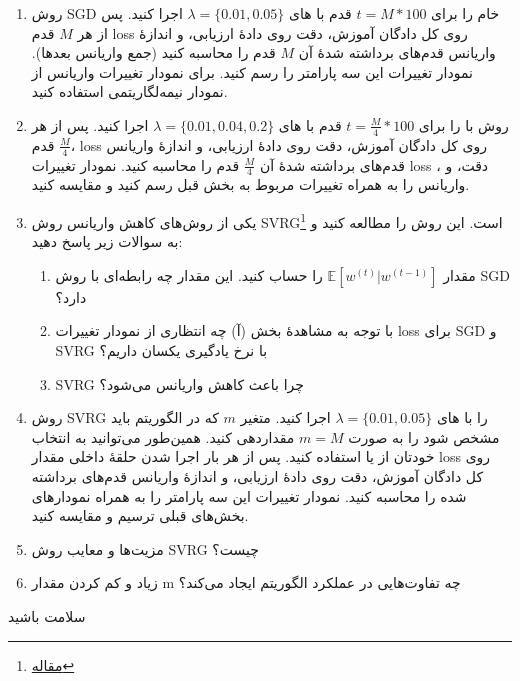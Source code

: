 \documentclass[11pt,a4paper]{article}
\begin{document}
\begin{enumerate}
\item
روش SGD خام
 را برای 
$t = M * 100$
قدم با 
های
$\lambda = \{0.01, 0.05\}$
اجرا کنید. پس از هر $M$ قدم loss روی کل دادگان آموزش، دقت روی دادهٔ ارزیابی، و اندازهٔ واریانس قدم‌های برداشته شدهٔ آن $M$ قدم را محاسبه کنید (جمع واریانس بعدها).
نمودار تغییرات این سه پارامتر را رسم کنید. برای نمودار تغییرات واریانس از نمودار نیمه‌لگاریتمی استفاده کنید.
\item
روش 
با
 را برای 
$t = \frac{M}{4} * 100$
قدم با 
های
$\lambda = \{0.01, 0.04, 0.2\}$
اجرا کنید. پس از هر 
$\frac{M}{4}$
قدم، loss روی کل دادگان آموزش، دقت روی دادهٔ ارزیابی، و اندازهٔ واریانس قدم‌های برداشته شدهٔ آن 
$\frac{M}{4}$
قدم را محاسبه کنید.
نمودار تغییرات loss ، دقت، و واریانس را به همراه تغییرات مربوط به بخش قبل رسم کنید و مقایسه کنید.
\item
یکی از روش‌های کاهش واریانس روش 
SVRG\footnote{ \href{https://papers.nips.cc/paper/4937-accelerating-stochastic-gradient-descent-using-predictive-variance-reduction.pdf}{مقاله}}
است. این روش را مطالعه کنید و به سوالات زیر پاسخ دهید:
\begin{enumerate}
\item
مقدار 
$\mathbb{E}[w^{(t)} | w^{(t - 1)}]$
را حساب کنید. این مقدار چه رابطه‌ای با روش SGD دارد؟
\item
با توجه به مشاهدهٔ بخش (آ) چه انتظاری از نمودار تغییرات loss برای SGD و SVRG با نرخ یادگیری یکسان داریم؟
\item
SVRG چرا باعث کاهش واریانس می‌شود؟
\end{enumerate}
\item
روش 
SVRG
 را با
های
$\lambda = \{0.01, 0.05\}$
اجرا کنید. متغیر $m$ که در الگوریتم باید مشخص شود را به صورت
$m = M$
مقداردهی کنید. همین‌طور می‌توانید به انتخاب خودتان از 
یا 
استفاده کنید. پس از هر بار اجرا شدن حلقهٔ داخلی مقدار loss روی کل دادگان آموزش، دقت روی دادهٔ ارزیابی، و اندازهٔ واریانس قدم‌های برداشته شده را محاسبه کنید. نمودار تغییرات این سه پارامتر را به همراه نمودارهای بخش‌های قبلی ترسیم و مقایسه کنید.
\item
مزیت‌ها و معایب روش SVRG چیست؟
\item
زیاد و کم کردن مقدار m چه تفاوت‌هایی در عملکرد الگوریتم ایجاد می‌کند؟
\end{enumerate}
\begin{flushleft}
سلامت باشید
\end{flushleft}
\end{document}
